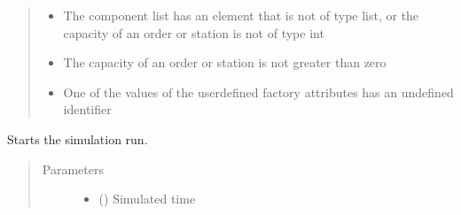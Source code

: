 \documentclass[letterpaper,10pt,english]{sphinxmanual}
\begin{document}
\begin{fulllineitems}
\begin{fulllineitems}
\begin{quote}
\begin{description}
\begin{itemize}
\item {} 
\sphinxAtStartPar
{} \textendash{} The component list has an element that is not of type list, or the capacity of an order or
station is not of type int

\item {} 
\sphinxAtStartPar
{} \textendash{} The capacity of an order or station is not greater than zero

\item {} 
\sphinxAtStartPar
{} \textendash{} One of the values of the user\sphinxhyphen{}defined factory attributes has an undefined
identifier

\end{itemize}

\end{description}\end{quote}

\end{fulllineitems}


\begin{fulllineitems}
\label{\detokenize{source/API/api:environment.Environment.simulate}}
\sphinxAtStartPar
Starts the simulation run.
\begin{quote}\begin{description}
\item[{Parameters}] \leavevmode\begin{itemize}
\item {} 
\sphinxAtStartPar
{} () \textendash{} Simulated time


\end{itemize}
\end{description}
\end{quote}
\end{fulllineitems}
\end{fulllineitems}
\end{document}
